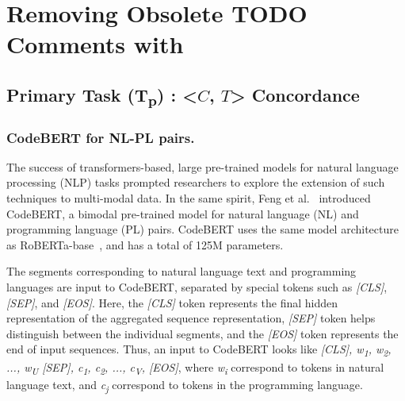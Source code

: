 \section{Removing Obsolete TODO Comments with \tool}

\subsection{Primary Task \texorpdfstring{(T\textsubscript{p})}{} : \texorpdfstring{<$C$, $T$>}{} Concordance}

\subsubsection{CodeBERT for NL-PL pairs.}
The success of transformers-based,
large pre-trained models for natural language processing 
(NLP) tasks prompted researchers to explore the extension 
of such techniques to multi-modal data. In the same spirit, 
Feng et al.~\cite{DBLP:journals/corr/abs-2002-08155} introduced CodeBERT, a bimodal pre-trained 
model for natural language (NL) and programming language 
(PL) pairs. CodeBERT uses the same model architecture as 
RoBERTa-base~\cite{DBLP:journals/corr/abs-1907-11692}, and has a total of 125M parameters.

The segments corresponding to natural language text and 
programming languages are input to CodeBERT, separated 
by special tokens such as {\em [CLS]}, {\em [SEP]}, and {\em [EOS]}. Here, the 
{\em [CLS]} token represents the final hidden representation of the
aggregated sequence representation, {\em [SEP]} token helps 
distinguish between the individual segments, and the {\em [EOS]} token
represents the end of input sequences. Thus, an input to CodeBERT 
looks like {\em [CLS], w\textsubscript{1}, w\textsubscript{2}, ..., w\textsubscript{U} [SEP], c\textsubscript{1}, c\textsubscript{2}, ..., c\textsubscript{V}, [EOS]}, 
where {\em w\textsubscript{i}} correspond to tokens in natural language text, and 
{\em c\textsubscript{j}} correspond to tokens in the programming language. 

